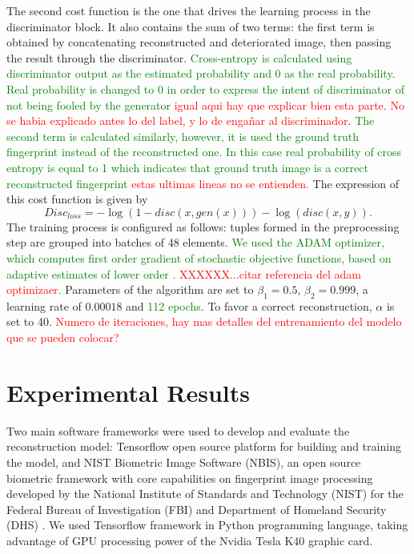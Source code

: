 \documentclass[a4paper,fleqn]{cas-dc}
\begin{document}
The second cost function is the one that drives the learning process in the discriminator block. It also contains the sum of two terms: the first term is obtained by concatenating reconstructed and deteriorated image, then passing the result through the discriminator. \textcolor{green}{Cross-entropy is calculated using discriminator output as the estimated probability and 0 as the real probability. Real probability is changed to 0 in order to express the intent of discriminator of not being fooled by the generator} \textcolor{red}{igual aqui hay que explicar bien esta parte. No se habia explicado antes lo del label, y lo de engañar al discriminador}. \textcolor{green}{The second term is calculated similarly, however, it is used the ground truth fingerprint instead of the reconstructed one. In this case real probability of cross entropy is equal to 1 which indicates that ground truth image is a correct reconstructed fingerprint} \textcolor{red}{estas ultimas lineas no se entienden.} The expression of this cost function is given by
\begin{equation}
    Disc_{loss} = -\log(1-disc(x,gen(x)))-\log(disc(x,y)).
\end{equation}
The training process is configured as follows: tuples formed in the preprocessing step are grouped into batches of 48 elements. \textcolor{green}{We used the ADAM optimizer, which computes first order gradient of stochastic objective functions, based on adaptive estimates of lower order \cite{kingma2014adam}. \textcolor{red}{XXXXXX...citar referencia del adam optimizaer}.} Parameters of the algorithm are set to $\beta_{1}=0.5$, $\beta_{2}=0.999$, a learning rate of $0.00018$ and \textcolor{green}{112 epochs}. To favor a correct reconstruction, $\alpha$ is set to 40. \textcolor{red}{Numero de iteraciones, hay mas detalles del entrenamiento del modelo que se pueden colocar?}


\section{Experimental Results}\label{sec:ER}
Two main software frameworks were used to develop and evaluate the reconstruction model: Tensorflow open source platform for building and training the model, and NIST Biometric Image Software (NBIS), an open source biometric framework with core capabilities on fingerprint image processing developed by the National Institute of Standards and Technology (NIST) for the Federal Bureau of Investigation (FBI) and Department of Homeland Security (DHS) \cite{NBISWP}. We used Tensorflow framework in Python programming language, taking advantage of GPU processing power of the Nvidia Tesla K40 graphic card.
\end{document}
